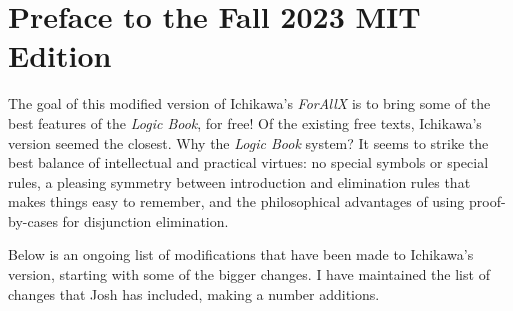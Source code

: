 
\chapter*{Preface to the Fall 2023 MIT Edition}
\label{ch.preface2}

The goal of this modified version of Ichikawa's \textit{ForAllX} is to bring some of the best features of the \textit{Logic Book}, for free!
Of the existing free texts, Ichikawa's version seemed the closest.
Why the \textit{Logic Book} system? 
It seems to strike the best balance of intellectual and practical virtues: no special symbols or special rules, a pleasing symmetry between introduction and elimination rules that makes things easy to remember, and the philosophical advantages of using proof-by-cases for disjunction elimination. 

Below is an ongoing list of modifications that have been made to Ichikawa's version, starting with some of the bigger changes.
I have maintained the list of changes that Josh has included, making a number additions.

